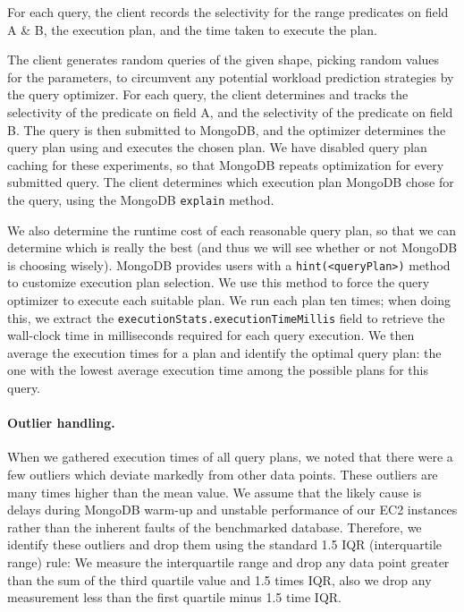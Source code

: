 For each query, the client records the selectivity for the range predicates on field A \& B, the execution plan, and the time taken to execute the plan. 

The client generates random queries of the given shape, picking random values for the parameters, to circumvent any potential workload prediction strategies by the query optimizer. For each query, the client determines and tracks the selectivity of the predicate on field A, and the selectivity of the predicate on field B. The query is then submitted to MongoDB, and the optimizer determines the query plan using \approachName and executes the chosen plan. We have disabled query plan caching for these experiments, so that MongoDB repeats optimization for every submitted query. The client determines which execution plan MongoDB chose for the query, using the MongoDB \verb|explain| method.

We also determine the runtime cost of each reasonable query plan, so that we can determine which is really the best (and thus we will see whether or not MongoDB is choosing wisely). %
MongoDB provides users with a \verb|hint(<queryPlan>)| method to customize execution plan selection. We use this method to force the query optimizer to execute each suitable plan. We run each plan ten times; when doing this, we extract the \texttt{execution\-Stats.\-execution\-Time\-Millis} field to retrieve
the wall-clock time in milliseconds required for each query execution. We then average the execution times for a plan and identify the optimal query plan: the one with the lowest average execution time among the possible plans for this query.

\paragraph{\textbf{Outlier handling.}} When we gathered execution times of all query plans, we noted
that there were a few outliers which deviate markedly from other data points. These outliers are
many times higher than the mean value. We assume that the likely cause is delays during MongoDB warm-up and unstable performance of our EC2 instances rather than the inherent faults of the benchmarked database. Therefore, we identify these outliers and drop them using the standard 1.5 IQR (interquartile range) rule: We measure the interquartile range  and drop any data point greater than the sum of the third quartile value and 1.5 times IQR, also we drop any measurement less than the first quartile minus 1.5 time IQR.

